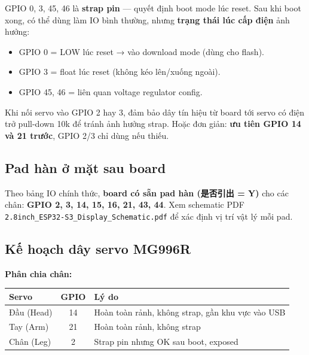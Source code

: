 \documentclass[11pt,a4paper]{article}
\begin{document}
\begin{tcolorbox}[warnbox,title={Cảnh báo strap pin}]
GPIO 0, 3, 45, 46 là \textbf{strap pin} — quyết định boot mode lúc reset. Sau khi boot xong, có thể dùng làm IO bình thường, nhưng \textbf{trạng thái lúc cấp điện} ảnh hưởng:
\begin{itemize}
  \item GPIO 0 = LOW lúc reset → vào download mode (dùng cho flash).
  \item GPIO 3 = float lúc reset (không kéo lên/xuống ngoài).
  \item GPIO 45, 46 = liên quan voltage regulator config.
\end{itemize}
Khi nối servo vào GPIO 2 hay 3, đảm bảo dây tín hiệu từ board tới servo có điện trở pull-down 10k để tránh ảnh hưởng strap. Hoặc đơn giản: \textbf{ưu tiên GPIO 14 và 21 trước}, GPIO 2/3 chỉ dùng nếu thiếu.
\end{tcolorbox}

\subsection{Pad hàn ở mặt sau board}
Theo bảng IO chính thức, \textbf{board có sẵn pad hàn (是否引出 = Y)} cho các chân: \textbf{GPIO 2, 3, 14, 15, 16, 21, 43, 44}. Xem schematic PDF \texttt{2.8inch\_ESP32-S3\_Display\_Schematic.pdf} để xác định vị trí vật lý mỗi pad.

\subsection{Kế hoạch dây servo MG996R}
\textbf{Phân chia chân:}
\begin{center}
\begin{tabular}{l|c|l}
\toprule
\textbf{Servo} & \textbf{GPIO} & \textbf{Lý do}\\
\midrule
Đầu (Head) & 14 & Hoàn toàn rảnh, không strap, gần khu vực vào USB\\
Tay (Arm)  & 21 & Hoàn toàn rảnh, không strap\\
Chân (Leg) & 2  & Strap pin nhưng OK sau boot, exposed\\
\bottomrule
\end{tabular}
\end{center}
\end{document}
